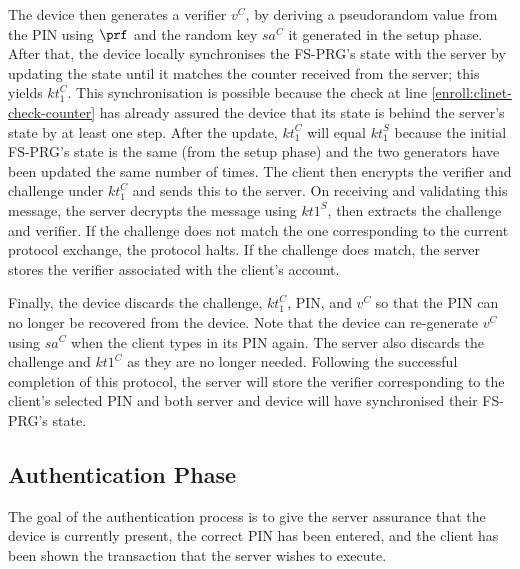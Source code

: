 \documentclass[runningheads]{llncs}
\newcommand{\sss}{\scriptscriptstyle}
\newcommand{\keyt}{\ensuremath{{kt}}}
\newcommand{\salt}{\ensuremath{{sa}}}
\renewcommand{\verifier}{\ensuremath{{v}}}
\newcommand{\VC}[1]{\ensuremath{#1^{\sss C}}}
\newcommand{\VS}[1]{\ensuremath{#1^{\sss S}}}
\begin{document}
The device then generates a verifier $\VC{\verifier}$, by deriving a pseudorandom value from the PIN using $\prf$ and the random key $\VC{\salt}$ it generated in the setup phase.  After that, the device locally synchronises the FS-PRG's state with the server by updating the state until it matches the counter received from the server; this yields \VC{\keyt_{\sss 1}}. This synchronisation is possible because the check at line \ref{enroll:clinet-check-counter} has already assured the device that its state is behind the server's state by at least one step. After the update, \VC{\keyt_{\sss 1}} will equal \VS{\keyt_{\sss 1}} because the initial FS-PRG's state is the same (from the setup phase) and the two generators have been updated the same number of times. The client then encrypts the verifier and challenge under \VC{\keyt_{\sss 1}} and sends this to the server.
%
%
On receiving and validating this message, the server decrypts the message using \VS{\keyt{\sss 1}}, then extracts the challenge and verifier.
If the challenge does not match the one corresponding to the current protocol exchange, the protocol halts.
If the challenge does match, the server stores the verifier associated with the client's account.

Finally, the device discards the challenge, \VC{\keyt_{\sss 1}}, PIN, and \VC{\verifier} so that the PIN can no longer be recovered from the device. Note that the device can re-generate \VC{\verifier} using \VC{\salt} when the client types in its PIN again. The server also discards the challenge and \VC{\keyt{\sss 1}} as they are no longer needed. Following the successful completion of this protocol, the server will store the verifier corresponding to the client's selected PIN and both server and device will have synchronised their FS-PRG's state.

\vspace{-4mm}
\subsection{Authentication Phase}
\label{sec:authentication}

The goal of the authentication process is to give the server assurance that the device is currently present, the correct PIN has been entered, and the client has been shown the transaction that the server wishes to execute. 
%
\end{document}

